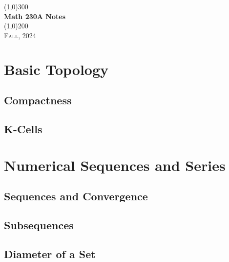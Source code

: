 \documentclass[a4paper, openany]{book}
\begin{document}
\begin{titlepage}
    \begin{center}
        \line(1,0){300} \\
        [0.25in]
        \huge{\bfseries Math 230A Notes} \\
        [2mm]
        \line(1,0){200} \\
        [1.5cm]
        \textsc{\LARGE Fall, 2024}
    \end{center}
\end{titlepage}

\tableofcontents
\setcounter{section}{0}

\chapter{Basic Topology}
\section{Compactness}

\newpage

\section{K-Cells}

\newpage

\chapter{Numerical Sequences and Series}
\section{Sequences and Convergence}

\newpage

\section{Subsequences}

\newpage

\section{Diameter of a Set}

\newpage
\end{document}

